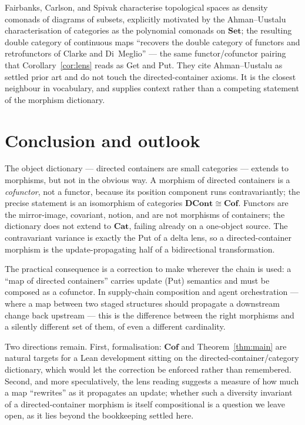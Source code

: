 \documentclass[11pt,a4paper]{amsart}
\newcommand{\Set}{\mathbf{Set}}
\newcommand{\Cat}{\mathbf{Cat}}
\newcommand{\Cof}{\mathbf{Cof}}
\newcommand{\DCont}{\mathbf{DCont}}
\theoremstyle{plain}
\theoremstyle{definition}
\theoremstyle{remark}
\begin{document}
Fairbanks, Carlson, and Spivak \cite{FCS26} characterise topological spaces as density comonads
of diagrams of subsets, explicitly motivated by the Ahman--Uustalu characterisation of categories
as the polynomial comonads on $\Set$; the resulting double category of continuous maps
``recovers the double category of functors and retrofunctors of Clarke and Di~Meglio'' --- the
same functor/cofunctor pairing that Corollary~\ref{cor:lens} reads as Get and Put. They cite
Ahman--Uustalu as settled prior art and do not touch the directed-container axioms. It is the
closest neighbour in vocabulary, and supplies context rather than a competing statement of the
morphism dictionary.

\section{Conclusion and outlook}\label{sec:conclusion}

The object dictionary --- directed containers are small categories --- extends to
morphisms, but not in the obvious way. A morphism of directed containers is a
\emph{cofunctor}, not a functor, because its position component runs contravariantly;
the precise statement is an isomorphism of categories $\DCont\cong\Cof$. Functors are
the mirror-image, covariant, notion, and are not morphisms of containers; the dictionary
does not extend to $\Cat$, failing already on a one-object source. The contravariant
variance is exactly the Put of a delta lens, so a directed-container morphism is the
update-propagating half of a bidirectional transformation.

The practical consequence is a correction to make wherever the chain is used: a ``map of
directed containers'' carries update (Put) semantics and must be composed as a cofunctor.
In supply-chain composition and agent orchestration --- where a map between two staged
structures should propagate a downstream change back upstream --- this is the difference
between the right morphisms and a silently different set of them, of even a different
cardinality.

Two directions remain. First, formalisation: $\Cof$ and Theorem~\ref{thm:main} are
natural targets for a Lean development sitting on the directed-container/category
dictionary, which would let the correction be enforced rather than remembered. Second,
and more speculatively, the lens reading suggests a measure of how much a map
``rewrites'' as it propagates an update; whether such a diversity invariant of a
directed-container morphism is itself compositional is a question we leave open, as it
lies beyond the bookkeeping settled here.
\end{document}
